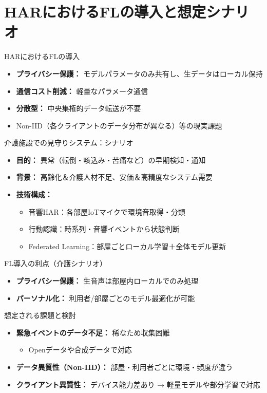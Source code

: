 \documentclass[unicode,12pt,aspectratio=169,dvipdfmx]{beamer}
\begin{document}
\section{HARにおけるFLの導入と想定シナリオ}

\begin{frame}{HARにおけるFLの導入}
  \begin{itemize}
    \item \textbf{プライバシー保護：} モデルパラメータのみ共有し、生データはローカル保持
    \item \textbf{通信コスト削減：} 軽量なパラメータ通信
    \item \textbf{分散型：} 中央集権的データ転送が不要
    \item Non-IID（各クライアントのデータ分布が異なる）等の現実課題
  \end{itemize}
\end{frame}

\begin{frame}{介護施設での見守りシステム：シナリオ}
  \begin{itemize}
    \item \textbf{目的：} 異常（転倒・咳込み・苦痛など）の早期検知・通知
    \item \textbf{背景：} 高齢化＆介護人材不足、安価＆高精度なシステム需要
    \item \textbf{技術構成：}
      \begin{itemize}
        \item 音響HAR：各部屋IoTマイクで環境音取得・分類
        \item 行動認識：時系列・音響イベントから状態判断
        \item Federated Learning：部屋ごとローカル学習＋全体モデル更新
      \end{itemize}
  \end{itemize}
\end{frame}

\begin{frame}{FL導入の利点（介護シナリオ）}
  \begin{itemize}
    \item \textbf{プライバシー保護：} 生音声は部屋内ローカルでのみ処理
    \item \textbf{パーソナル化：} 利用者/部屋ごとのモデル最適化が可能
  \end{itemize}
\end{frame}


\begin{frame}{想定される課題と検討}
  \begin{itemize}
    \item \textbf{緊急イベントのデータ不足：} 稀なため収集困難
      \begin{itemize}
        \item Openデータや合成データで対応
      \end{itemize}
    \item \textbf{データ異質性（Non-IID）：} 部屋・利用者ごとに環境・頻度が違う
    \item \textbf{クライアント異質性：} デバイス能力差あり → 軽量モデルや部分学習で対応
  \end{itemize}
\end{frame}
\end{document}
